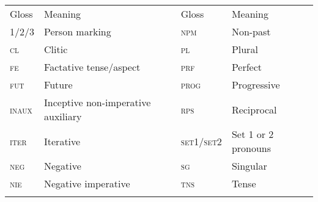 \documentclass[output=paper]{langsci/langscibook}
\begin{document}
\begin{tabularx}{\textwidth}{XXXX}
\lsptoprule

{Gloss} & {Meaning} & {Gloss} & {Meaning}\\
{\scshape 1/2/3} & {Person marking} & {\scshape npm} & {Non-past }\\
{\scshape cl} & {Clitic} & {\scshape pl} & {Plural }\\
{\scshape fe} & {Factative tense/aspect} & {\scshape prf} & {Perfect }\\
{\scshape fut} & {Future} & {\scshape prog} & {Progressive}\\
{\scshape inaux} & {Inceptive non-imperative auxiliary} & {\scshape rps} & {Reciprocal }\\
{\scshape iter} & {Iterative} & {\scshape set1/set2} & {Set 1 or 2 pronouns}\\
{\scshape neg} & {Negative} & {\scshape sg} & {Singular }\\
{\scshape nie} & {Negative imperative} & {\scshape tns} & {Tense }\\
\lspbottomrule
\end{tabularx}
 
\end{document}
